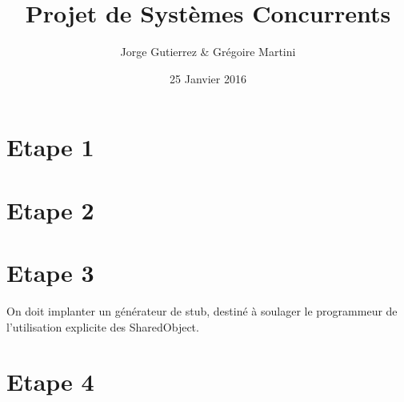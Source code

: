 \documentclass[a4paper,12pt]{article}
\title{Projet de Systèmes Concurrents}
\author{Jorge Gutierrez \& Grégoire Martini}
\date{25 Janvier 2016}
\begin{document}
\maketitle
\tableofcontents
\newpage


\section{Etape 1}


\section{Etape 2}


\section{Etape 3}

On doit  implanter un générateur de stub, destiné à soulager le programmeur de l'utilisation explicite des SharedObject. 


\section{Etape 4}
\end{document}
